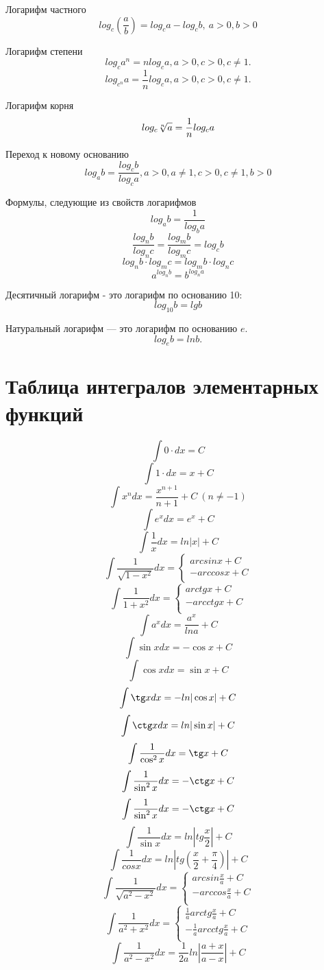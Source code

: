 \documentclass[a5paper, 8pt]{extarticle}
\begin{document}
Логарифм частного
$$log_c(\frac{a}{b})=log_ca-log_cb, \ a>0, b>0$$

Логарифм степени
$$log_ca^n=nlog_ca, a>0, c>0, c\not=1.$$
$$log_{c^n}a=\frac{1}{n}log_ca, a>0, c>0, c\not=1.$$

Логарифм корня
$$log_c \root{n}\of{a}=\frac{1}{n}log_ca$$

Переход к новому основанию
$$log_ab=\frac{log_cb}{log_ca}, a>0, a\not=1, c>0, c\not=1, b>0$$

Формулы, следующие из свойств логарифмов
$$log_ab=\frac{1}{log_ba}$$
$$\frac{log_nb}{log_nc}=\frac{log_mb}{log_mc}=log_cb$$
$$log_nb\cdot log_mc=log_mb\cdot log_nc$$
$$a^{log_nb}=b^{log_na}$$

Десятичный логарифм - это логарифм по основанию 10:
$$log_{10}b=lgb$$

Натуральный логарифм --- это логарифм по основанию $e.$
$$log_eb=ln b.$$

\section{Таблица интегралов элементарных функций}

$$\int 0\cdot dx=C$$
$$\int 1\cdot dx=x+C$$
$$\int x^n dx=\frac{x^{n+1}}{n+1}+C \ (n\not= -1)$$
$$\int e^x dx=e^x+C$$
$$\int \frac{1}{x}dx=ln|x|+C$$
$$
\int\frac{1}{\sqrt{1-x^2}}dx=
\left\{
\begin{array}{l}
arcsin x+C\\
-arccos x+C\\
\end{array}
\right.
$$
$$
\int\frac{1}{1+x^2}dx=
\left\{
\begin{array}{l}
arctg x+C\\
-arcctg x+C\\
\end{array}
\right.
$$
$$\int a^xdx=\frac{a^x}{lna}+C$$
$$\int \sin x dx=-\cos x+C$$
$$\int \cos x dx=\sin x+C$$
$$\int \tg x dx=-ln|\cos x|+C$$
$$\int \ctg x dx=ln|\sin x| +C$$
$$\int\frac{1}{\cos^2x}dx=\tg x +C$$
$$\int\frac{1}{\sin^2 x}dx=-\ctg x +C$$
$$\int\frac{1}{\sin^2x}dx=-\ctg x +C$$
$$\int \frac{1}{\sin x}dx=ln\left|tg\frac{x}{2}\right|+C$$
$$\int\frac{1}{cos x}dx=ln\left|tg(\frac{x}{2}+\frac{\pi}{4})\right|+C$$
$$
\int\frac{1}{\sqrt{a^2-x^2}}dx=
\left\{
\begin{array}{l}
arcsin\frac{x}{a}+C\\
-arccos\frac{x}{a}+C\\
\end{array}
\right.
$$
$$
\int\frac{1}{a^2+x^2}dx=
\left\{
\begin{array}{l}
\frac{1}{a}arctg\frac{x}{a}+C\\
-\frac{1}{a}arcctg\frac{x}{a}+C\\
\end{array}
\right.
$$
$$
\int\frac{1}{a^2-x^2}dx=
\frac{1}{2a}ln|\frac{a+x}{a-x}|+C
$$
\end{document}
